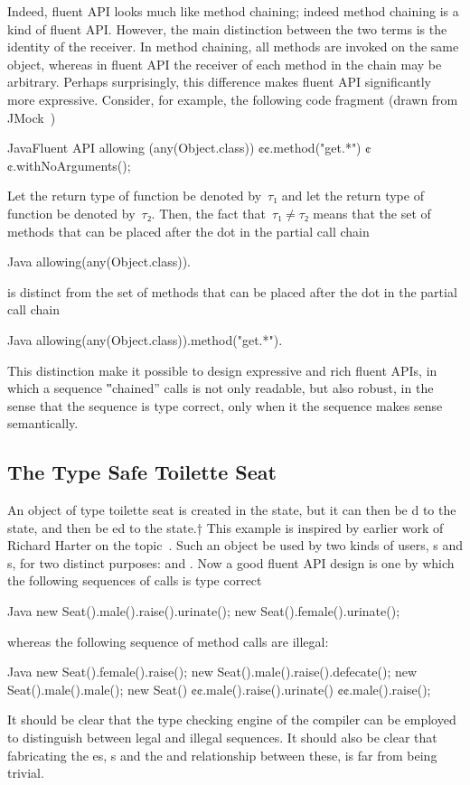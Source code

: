 Indeed, fluent API looks much like method chaining; indeed method chaining is a kind
  of fluent API{}.
However, the main distinction between the two terms is the identity of the receiver.
In method chaining, all methods are invoked on the same object, whereas in fluent API
  the receiver of each method in the chain may be arbitrary.
Perhaps surprisingly, this difference makes fluent API significantly more expressive.
Consider, for example, the following code fragment (drawn from JMock~\cite{Freeman:Pryce:06})
\begin{lCode}{Java}{Fluent API}
allowing (any(Object.class))
  ¢¢.method("get.*")
  ¢¢.withNoArguments();
\end{lCode}
Let the return type of function  be denoted by~$τ₁$ and let the return type of function  be denoted by~$τ₂$.
Then, the fact that~$τ₁≠τ₂$ means that the set of methods that can be placed after the dot
in the partial call chain
\begin{lcode}{Java}
 allowing(any(Object.class)).
\end{lcode}
is distinct from the set of methods that can be placed after the dot in the partial call chain
\begin{lcode}{Java}
allowing(any(Object.class)).method("get.*").
\end{lcode}
This distinction make it possible to design expressive and rich fluent APIs, in which a sequence ‟chained” calls is not only readable, but also
robust, in the sense that the sequence is type correct, only when it the sequence makes sense semantically.

\subsection{The Type Safe Toilette Seat}

An object of type toilette seat is created in the  state, but it can
then be d to the  state, and then be ed to the
 state.†{%
This example is inspired by earlier work of 
  Richard Harter on the topic~\cite{Harter:05}.}
Such an object be used by two kinds of users, s and s, for two distinct purposes:  and .
Now a good fluent API design is one by which the following sequences of calls is type correct
\begin{lcode}{Java}
new Seat().male().raise().urinate();
new Seat().female().urinate();
 \end{lcode}
whereas the following sequence of method calls are illegal:
\begin{lcode}{Java}
new Seat().female().raise();
new Seat().male().raise().defecate();
new Seat().male().male();
new Seat()
     ¢¢.male().raise().urinate()
     ¢¢.male().raise();
\end{lcode}
It should be clear that the type checking engine of the compiler can
be employed to distinguish between legal and illegal sequences.
It should also be clear that fabricating the es, s
and the  and  relationship between these, is
far from being trivial.

